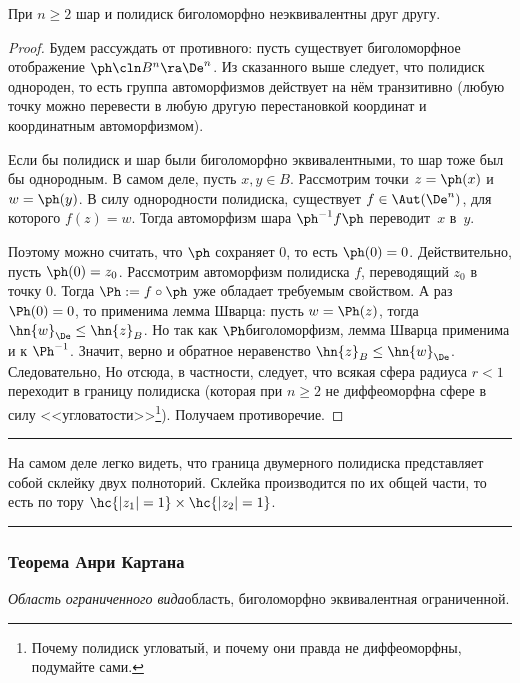 \documentclass[a4paper]{article}
\newenvironment{petit}
{\par\smallskip\hrule\smallskip\footnotesize}{\par\smallskip\hrule\smallskip}
\begin{document}
\begin{theorem}
При $n \ge 2$ шар и полидиск биголоморфно неэквивалентны друг другу.
\end{theorem}
\begin{proof}
Будем рассуждать от противного: пусть существует биголоморфное отображение $\ph\cln B^n \ra \De^n$.
Из сказанного выше следует, что полидиск однороден, то есть
группа автоморфизмов действует на нём транзитивно (любую точку можно перевести в любую другую
перестановкой координат и координатным автоморфизмом).

Если бы полидиск и шар были биголоморфно эквивалентными, то шар тоже был бы однородным.
В самом деле, пусть $x, y \in B$. Рассмотрим точки $z = \ph(x)$ и $w = \ph(y)$. В силу однородности
полидиска, существует $f \in \Aut(\De^n)$, для которого $f(z) = w$. Тогда автоморфизм
шара $\ph^{-1} f \ph$ переводит~$x$ в~$y$.

Поэтому можно считать, что $\ph$ сохраняет $0$, то есть $\ph(0) = 0$. Действительно, пусть $\ph(0) = z_0$.
Рассмотрим автоморфизм полидиска $f$, переводящий $z_0$ в точку $0$. Тогда $\Ph := f \circ\ph$ уже обладает
требуемым свойством. А раз $\Ph(0) = 0$, то применима лемма Шварца: пусть $w = \Ph(z)$, тогда
$\hn{w}_\De \le \hn{z}_B$. Но так как $\Ph$\т биголоморфизм, лемма Шварца применима и к $\Ph^{-1}$.
Значит, верно и обратное неравенство $\hn{z}_B \le \hn{w}_\De$. Следовательно,
Но отсюда, в частности, следует, что всякая сфера радиуса $r < 1$ переходит в границу полидиска
(которая при $n\ge 2$ не диффеоморфна сфере в силу
<<угловатости>>\footnote{Почему полидиск угловатый, и почему они правда не диффеоморфны, подумайте сами.}).
Получаем противоречие.
\end{proof}

\begin{petit}
На самом деле легко видеть, что граница двумерного полидиска представляет собой склейку двух полноторий.
Склейка производится по их общей части, то есть по тору $\hc{|z_1|=1}\times \hc{|z_2|=1}$.
\end{petit}

\subsubsection{Теорема Анри Картана}

\begin{df}
\emph{Область ограниченного вида}\т область, биголоморфно эквивалентная ограниченной.
\end{df}
\end{document}
